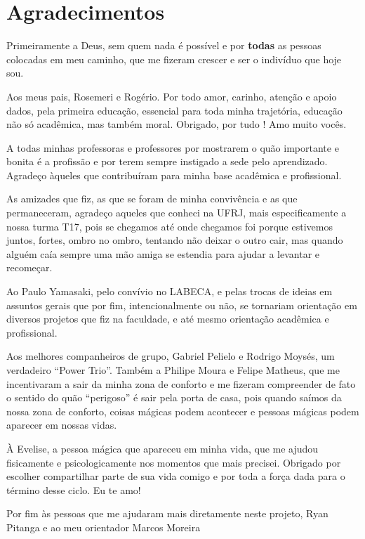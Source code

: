 \chapter*{Agradecimentos} Primeiramente a Deus, sem
quem nada é possível e por \mbox{\textbf{todas}} as pessoas colocadas em meu caminho, que
me fizeram crescer e ser o indivíduo que hoje sou.

Aos meus pais, Rosemeri e Rogério. Por todo amor, carinho, atenção e
apoio dados, pela primeira educação, essencial para toda minha
trajetória, educação não só acadêmica, mas também moral. Obrigado, por tudo ! Amo muito vocês.

A todas minhas professoras e professores por 
 mostrarem o quão importante e bonita é a profissão e por terem sempre
 instigado a sede pelo aprendizado. Agradeço àqueles que contribuíram para
 minha base acadêmica e profissional.

As amizades que fiz, as que se foram de minha convivência e
   as que permaneceram, agradeço aqueles que conheci na UFRJ, mais especificamente a nossa turma T17,
   pois se chegamos até onde chegamos foi porque estivemos juntos, fortes, ombro
   no ombro, tentando não deixar o outro cair, mas quando alguém caía
   sempre uma mão amiga se estendia para ajudar a levantar e recomeçar. 

Ao Paulo Yamasaki, pelo convívio no LABECA, e pelas
   trocas de ideias em assuntos gerais que por fim, intencionalmente ou não, se
   tornariam orientação em diversos projetos que fiz na faculdade, e até mesmo
   orientação acadêmica e profissional. 

Aos melhores companheiros de grupo, Gabriel Pelielo e Rodrigo Moysés, um
verdadeiro ``Power Trio''. Também a Philipe Moura e Felipe Matheus, que me
incentivaram a sair da minha zona de conforto e me fizeram compreender de fato o sentido do quão
``perigoso'' é sair pela porta de casa, pois quando saímos da nossa zona de
conforto, coisas mágicas podem acontecer e pessoas mágicas podem aparecer em
nossas vidas.

À Evelise, a pessoa mágica que apareceu em minha vida, que me ajudou
fisicamente e psicologicamente nos momentos que mais precisei. Obrigado por escolher compartilhar parte de sua
vida comigo e por toda a força dada para o término desse ciclo. Eu te amo!  

Por fim às pessoas que me ajudaram mais diretamente neste projeto, Ryan
Pitanga e ao meu orientador Marcos Moreira 

